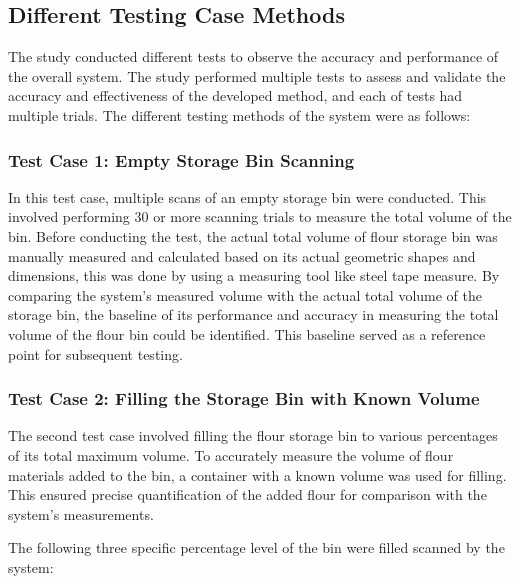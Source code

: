 
\subsection{Different Testing Case Methods}
\label{ch3:subsec:Different Testing Procedure}
The study conducted different tests to observe the accuracy and performance of the overall system. The study performed multiple tests to assess and validate the accuracy and effectiveness of the developed method, and each of tests had multiple trials. The different testing methods of the system were as follows:

\subsubsection{Test Case 1: Empty Storage Bin Scanning}

In this test case, multiple scans of an empty storage bin were conducted. This involved performing 30 or more scanning trials to measure the total volume of the bin. Before conducting the test, the actual total volume of flour storage bin was manually measured and calculated based on its actual geometric shapes and dimensions, this was done by using a measuring tool like steel tape measure. By comparing the system's measured volume with the actual total volume of the storage bin, the baseline of its performance and accuracy in measuring the total volume of the flour bin could be identified. This baseline served as a reference point for subsequent testing.

\subsubsection{Test Case 2: Filling the Storage Bin with Known Volume}
\label{ch3:subsec:test-case-2}

The second test case involved filling the flour storage bin to various percentages of its total maximum volume. To accurately measure the volume of flour materials added to the bin, a container with a known volume was used for filling. This ensured precise quantification of the added flour for comparison with the system's measurements.

The following three specific percentage level of the bin were filled scanned by the system:


